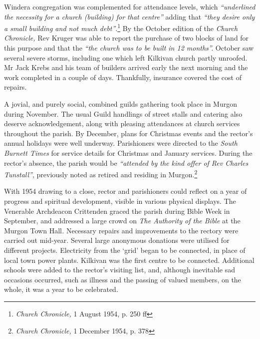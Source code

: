 Windera congregation was complemented for attendance levels, which \emph{``underlined the necessity for a church (building) for that centre''} adding that \emph{``they desire only a small building and not much debt''}.\footnote{\emph{Church Chronicle,} 1 August 1954, p. 250 ff} By the October edition of the \emph{Church Chronicle,} Rev Kruger was able to report the purchase of two blocks of land for this purpose and that the \emph{``the church was to be built in 12 months''.} October saw several severe storms, including one which left Kilkivan church partly unroofed. Mr Jack Krebs and his team of builders arrived early the next morning and the work completed in a couple of days. Thankfully, insurance covered the cost of repairs.


A jovial, and purely social, combined guilds gathering took place in Murgon during November. The usual Guild handlings of street stalls and catering also deserve acknowledgement, along with pleasing attendances at church services throughout the parish. By December, plans for Christmas events and the rector's annual holidays were well underway. Parishioners were directed to the \emph{South Burnett Times} for service details for Christmas and January services. During the rector's absence, the parish would be \emph{``attended by the kind offer of Rev Charles Tunstall''}, previously noted as retired and residing in Murgon.\footnote{\emph{Church Chronicle,} 1 December 1954, p. 378}


With 1954 drawing to a close, rector and parishioners could reflect on a year of progress and spiritual development, visible in various physical displays. The Venerable Archdeacon Crittenden graced the parish during Bible Week in September, and addressed a large crowd on \emph{The Authority of the Bible} at the Murgon Town Hall\emph{.} Necessary repairs and improvements to the rectory were carried out mid-year. Several large anonymous donations were utilised for different projects. Electricity from the `grid' began to be connected, in place of local town power plants. Kilkivan was the first centre to be connected. Additional schools were added to the rector's visiting list, and, although inevitable sad occasions occurred, such as illness and the passing of valued members, on the whole, it was a year to be celebrated.



